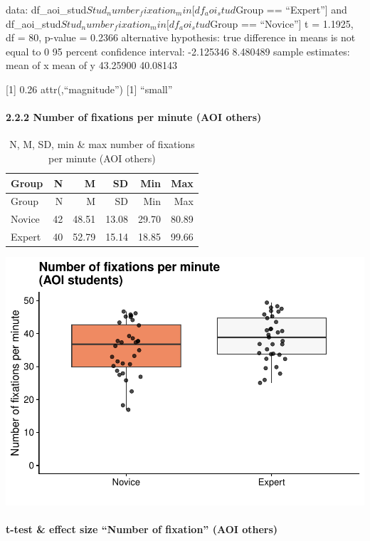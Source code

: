 \documentclass[
]{article}
\begin{document}
data: df\_aoi\_stud\(Stud_number_fixation_min[df_aoi_stud\)Group ==
``Expert''{]} and
df\_aoi\_stud\(Stud_number_fixation_min[df_aoi_stud\)Group ==
``Novice''{]} t = 1.1925, df = 80, p-value = 0.2366 alternative
hypothesis: true difference in means is not equal to 0 95 percent
confidence interval: -2.125346 8.480489 sample estimates: mean of x mean
of y 43.25900 40.08143

{[}1{]} 0.26 attr(,``magnitude'') {[}1{]} ``small''

\paragraph{2.2.2 Number of fixations per minute (AOI
others)}\label{number-of-fixations-per-minute-aoi-others}

\begin{longtable}[]{@{}lrrrrr@{}}
\caption{N, M, SD, min \& max number of fixations per minute (AOI
others)}\tabularnewline
\toprule\noalign{}
Group & N & M & SD & Min & Max \\
\midrule\noalign{}
\endfirsthead
\toprule\noalign{}
Group & N & M & SD & Min & Max \\
\midrule\noalign{}
\endhead
\bottomrule\noalign{}
\endlastfoot
Novice & 42 & 48.51 & 13.08 & 29.70 & 80.89 \\
Expert & 40 & 52.79 & 15.14 & 18.85 & 99.66 \\
\end{longtable}

\includegraphics{expertise_2024_09_26_no_outlierdetection_MK_files/figure-latex/nof_others-1.pdf}

\paragraph{t-test \& effect size ``Number of fixation'' (AOI
others)}\label{t-test-effect-size-number-of-fixation-aoi-others}
\end{document}
